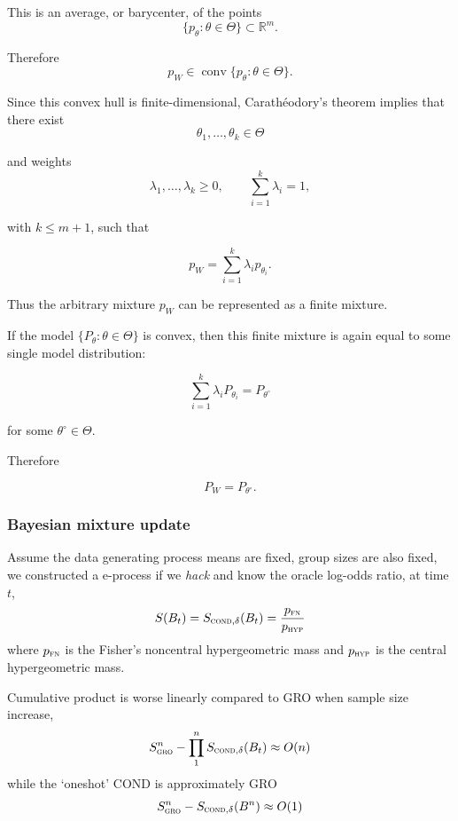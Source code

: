This is an average, or barycenter, of the points
$$
\{p_\theta:\theta\in\Theta\}\subset\mathbb R^m.
$$

Therefore
$$
p_W\in\operatorname{conv}\{p_\theta:\theta\in\Theta\}.
$$

Since this convex hull is finite-dimensional, Carathéodory's theorem implies that there exist
$$
\theta_1,\dots,\theta_k\in\Theta
$$

and weights
$$
\lambda_1,\dots,\lambda_k\ge 0,
\qquad
\sum_{i=1}^k\lambda_i=1,
$$

with $k\le m+1$, such that

$$
p_W
=
\sum_{i=1}^k \lambda_i p_{\theta_i}.
$$

Thus the arbitrary mixture $p_W$ can be represented as a finite mixture.

If the model $\{P_\theta:\theta\in\Theta\}$ is convex, then this finite mixture is again equal to some single model distribution:

$$
\sum_{i=1}^k \lambda_i P_{\theta_i}
=
P_{\theta^\circ}
$$

for some $\theta^\circ\in\Theta$.

Therefore

$$
P_W=P_{\theta^\circ}.
$$

\subsubsection{Bayesian mixture update}

Assume the data generating process means are fixed, group sizes are also fixed,
we constructed a e-process if we \emph{hack} and know the oracle log-odds ratio,
at time $t$,
\begin{equation*}
	S(B_t) = S_{\textsc{cond}, \delta}(B_t) = \frac{p_{\textsc{fn}}}{p_{\textsc{hyp}}}
\end{equation*}
where $p_{\textsc{fn}}$ is the Fisher's noncentral hypergeometric mass
and $p_{\textsc{hyp}}$ is the central hypergeometric mass.

Cumulative product is worse linearly compared to GRO when sample size increase,
\begin{equation*}
	S^n_{\textsc{gro}} - \prod_1^{n} S_{\textsc{cond}, \delta}(B_t) \approx O(n) 
\end{equation*}
while the `oneshot' COND is approximately GRO
\begin{equation*}
	S^n_{\textsc{gro}} - S_{\textsc{cond}, \delta}(B^n) \approx O(1) 
\end{equation*}

